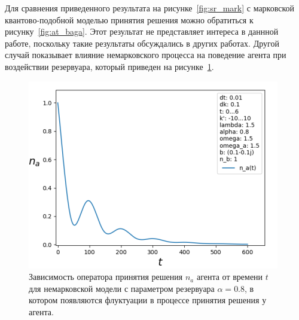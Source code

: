 Для сравнения приведенного результата на рисунке~\ref{fig:sr_mark} с марковской квантово-подобной
моделью принятия решения можно обратиться к рисунку~\ref{fig:at_baga}.
Этот результат не представляет интереса в даннной работе, поскольку такие результаты обсуждались в других работах.
Другой случай показывает влияние немарковского процесса на поведение агента при воздействии резервуара,
который приведен на рисунке~\ref{fig:sr_nomark}.
\newpage
\begin{figure}[h!]
    \centering
    \captionsetup{justification=centering}
    \includegraphics[width=0.7\linewidth]{pictures/result_second_2.png}
    \caption{Зависимость оператора принятия решения $n_{a}$ агента от времени $t$ для немарковской модели
    с параметром резервуара $\alpha = 0.8$, в котором появляются флуктуации в процессе принятия решения у агента.}
    \label{fig:sr_nomark}
\end{figure}

